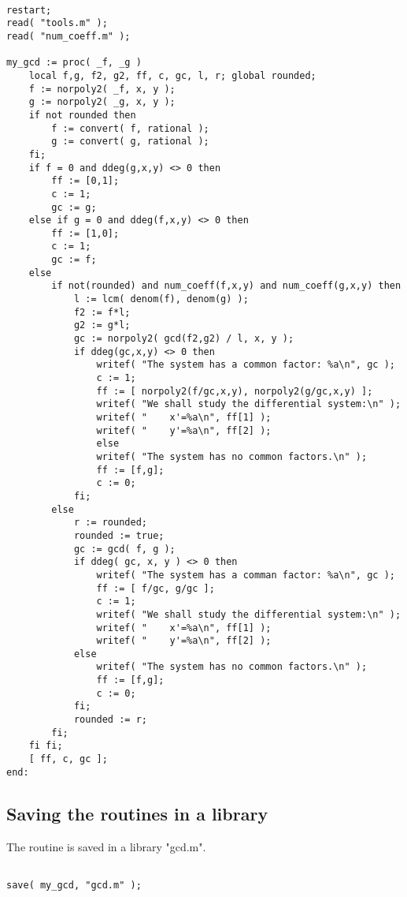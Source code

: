 \documentclass[a4paper,10pt]{article}
\begin{document}
\begin{lstlisting}[name=gcd]

restart;
read( "tools.m" );
read( "num_coeff.m" );

my_gcd := proc( _f, _g )
    local f,g, f2, g2, ff, c, gc, l, r; global rounded;
    f := norpoly2( _f, x, y );
    g := norpoly2( _g, x, y );
    if not rounded then
        f := convert( f, rational );
        g := convert( g, rational );
    fi;
    if f = 0 and ddeg(g,x,y) <> 0 then
        ff := [0,1];
        c := 1;
        gc := g;
    else if g = 0 and ddeg(f,x,y) <> 0 then
        ff := [1,0];
        c := 1;
        gc := f;
    else
        if not(rounded) and num_coeff(f,x,y) and num_coeff(g,x,y) then
            l := lcm( denom(f), denom(g) );
            f2 := f*l;
            g2 := g*l;
            gc := norpoly2( gcd(f2,g2) / l, x, y );
            if ddeg(gc,x,y) <> 0 then
                writef( "The system has a common factor: %a\n", gc );
                c := 1;
                ff := [ norpoly2(f/gc,x,y), norpoly2(g/gc,x,y) ];
                writef( "We shall study the differential system:\n" );
                writef( "    x'=%a\n", ff[1] );
                writef( "    y'=%a\n", ff[2] );
                else
                writef( "The system has no common factors.\n" );
                ff := [f,g];
                c := 0;
            fi;
        else
            r := rounded;
            rounded := true;
            gc := gcd( f, g );
            if ddeg( gc, x, y ) <> 0 then
                writef( "The system has a comman factor: %a\n", gc );
                ff := [ f/gc, g/gc ];
                c := 1;
                writef( "We shall study the differential system:\n" );
                writef( "    x'=%a\n", ff[1] );
                writef( "    y'=%a\n", ff[2] );
            else
                writef( "The system has no common factors.\n" );
                ff := [f,g];
                c := 0;
            fi;
            rounded := r;
        fi;
    fi fi;
    [ ff, c, gc ];
end:
\end{lstlisting}


\subsection{Saving the routines in a library}

The routine is saved in a library "gcd.m".

\begin{lstlisting}[name=gcd]

save( my_gcd, "gcd.m" );

\end{lstlisting}
\end{document}

